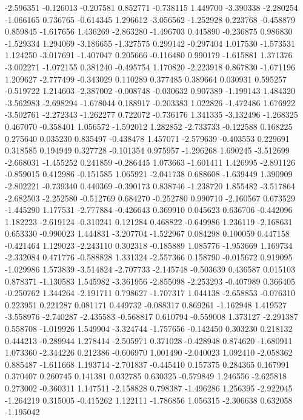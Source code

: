 -2.596351
-0.126013
-0.207581
0.852771
-0.738115
1.449700
-3.390338
-2.280254
-1.066165
0.736765
-0.614345
1.296612
-3.056562
-1.252928
0.223768
-0.458879
0.859845
-1.617656
1.436269
-2.863280
-1.496703
0.445890
-0.236875
0.986830
-1.529334
1.294069
-3.186655
-1.327575
0.299142
-0.297404
1.017530
-1.573531
1.124250
-3.017691
-1.407047
0.205666
-0.116480
0.990179
-1.615881
1.371376
-3.002271
-1.072155
0.381240
-0.495754
1.170820
-2.223918
0.867830
-1.671196
1.209627
-2.777499
-0.343029
0.110289
0.377485
0.389664
0.030931
0.595257
-0.519722
1.214603
-2.387002
-0.008748
-0.030632
0.907389
-1.199143
1.484320
-3.562983
-2.698294
-1.678044
0.188917
-0.203383
1.022826
-1.472486
1.676922
-3.502761
-2.272343
-1.262277
0.722072
-0.736176
1.341335
-3.132496
-1.268325
0.467070
-0.358401
1.056572
-1.592012
1.282852
-2.733733
-0.122588
0.168225
0.275640
0.035230
0.835497
-0.438478
1.457071
-2.579639
-0.403553
0.229691
0.318585
0.194949
0.327728
-0.101354
0.975957
-1.296268
1.690245
-3.512699
-2.668031
-1.455252
0.241859
-0.286445
1.073663
-1.601411
1.426995
-2.891126
-0.859015
0.412986
-0.151585
1.065921
-2.041738
0.688608
-1.639449
1.390909
-2.802221
-0.739340
0.440369
-0.390173
0.838746
-1.238720
1.855482
-3.517864
-2.682503
-2.252580
-0.512769
0.684270
-0.252780
0.990710
-2.160567
0.673529
-1.445290
1.177531
-2.777884
-0.426643
0.369910
0.045623
0.636706
-0.442096
1.182223
-2.619124
-0.310241
0.121284
0.468822
-0.649986
1.236119
-2.168631
0.653330
-0.990023
1.444831
-3.207704
-1.522967
0.084298
0.100059
0.447158
-0.421464
1.129023
-2.243110
0.302318
-0.185889
1.085776
-1.953669
1.169734
-2.332084
0.471776
-0.588828
1.331324
-2.557366
0.158790
-0.015672
0.919095
-1.029986
1.573839
-3.514824
-2.707733
-2.145748
-0.503639
0.436587
0.015103
0.878371
-1.130583
1.545982
-3.361956
-2.855098
-2.253293
-0.407989
0.366405
-0.250762
1.344264
-2.191711
0.798627
-1.707317
1.044138
-2.658853
-0.076310
0.223951
0.221287
0.081171
0.449732
-0.088317
0.869261
-1.162948
1.419527
-3.558976
-2.740287
-2.435583
-0.568817
0.610794
-0.559008
1.373127
-2.291387
0.558708
-1.019926
1.549904
-3.324744
-1.757656
-0.142450
0.303230
0.218132
0.444213
-0.289944
1.278414
-2.505971
0.371028
-0.428948
0.874620
-1.680911
1.073360
-2.344226
0.212386
-0.606970
1.001490
-2.040023
1.092410
-2.058362
0.885487
-1.611668
1.193714
-2.701837
-0.445410
0.157375
0.284365
0.167991
0.370407
0.260745
0.141381
0.032785
0.630325
-0.579849
1.246556
-2.625818
0.273002
-0.360311
1.147511
-2.158828
0.798387
-1.496286
1.256395
-2.922045
-1.264219
0.315005
-0.415262
1.122111
-1.786856
1.056315
-2.306638
0.632058
-1.195042
